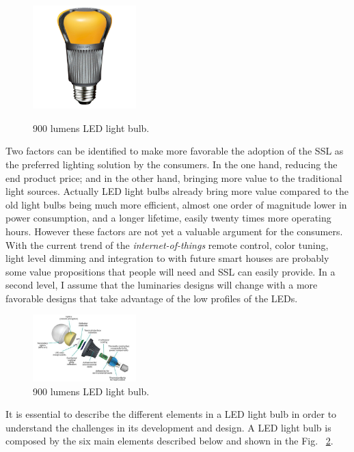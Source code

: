 \begin{figure}[!h]
\centering
\includegraphics[width=4cm]{./0_intro/img/enduraled-12w.jpg}
\label{fig:l_prize}
\caption{900 lumens LED light bulb.}
\end{figure}

Two factors can be identified to make more favorable the adoption of the SSL as the preferred lighting solution by the consumers. In the one hand, reducing the end product price; and in the other hand, bringing more value to the traditional light sources. Actually LED light bulbs already bring more value compared to the old light bulbs being much more efficient, almost one order of magnitude lower in power consumption, and a longer lifetime, easily twenty times more operating hours. However these factors are not yet a valuable argument for the consumers. With the current trend of the \emph{internet-of-things} remote control, color tuning, light level dimming and integration to with future smart houses are probably some value propositions that people will need and SSL can easily provide. In a second level, I assume that the luminaries designs will change with a more favorable designs that take advantage of the low profiles of the LEDs.
 
 \begin{figure}[!h]
\centering
\includegraphics[width=4cm]{./0_intro/img/exploded_bulb_2.jpg}
\caption{900 lumens LED light bulb.}
\label{fig:exploded_bulb}
\end{figure}
 
It is essential to describe the different elements in a LED light bulb in order to understand the challenges in its development and  design. A LED light bulb is composed by the six main elements described below and shown in  the Fig. ~\ref{fig:exploded_bulb}. 


